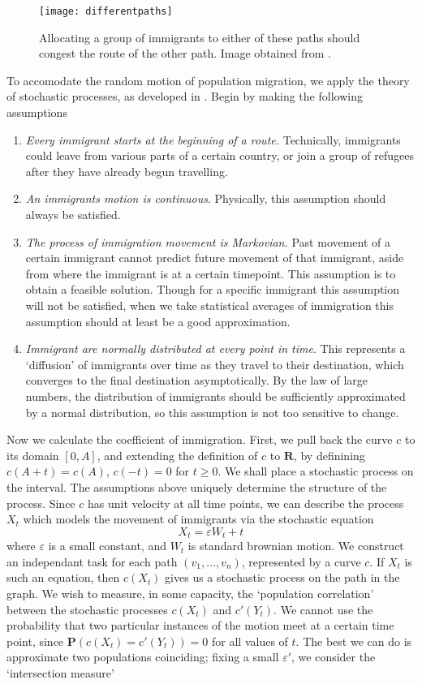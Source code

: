 \documentclass{article}
\begin{document}
\begin{figure}[h]
\begin{center}
\texttt{[image: differentpaths]}
\caption{Allocating a group of immigrants to either of these paths should congest the route of the other path. Image obtained from \cite{twocurve}.}
\end{center}
\end{figure}

To accomodate the random motion of population migration, we apply the theory of stochastic processes, as developed in \cite{lawler}. Begin by making the following assumptions
%
\begin{enumerate}
    \item {\it Every immigrant starts at the beginning of a route.} Technically, immigrants could leave from various parts of a certain country, or join a group of refugees after they have already begun travelling.
    \item {\it An immigrants motion is continuous}. Physically, this assumption should always be satisfied.
    \item {\it The process of immigration movement is Markovian.} Past movement of a certain immigrant cannot predict future movement of that immigrant, aside from where the immigrant is at a certain timepoint. This assumption is to obtain a feasible solution. Though for a specific immigrant this assumption will not be satisfied, when we take statistical averages of immigration this assumption should at least be a good approximation.
    \item {\it Immigrant are normally distributed at every point in time}. This represents a `diffusion' of immigrants over time as they travel to their destination, which converges to the final destination asymptotically. By the law of large numbers, the distribution of immigrants should be sufficiently approximated by a normal distribution, so this assumption is not too sensitive to change.
\end{enumerate}
%
Now we calculate the coefficient of immigration. First, we pull back the curve $c$ to its domain $[0,A]$, and extending the definition of $c$ to $\mathbf{R}$, by definining $c(A + t) = c(A)$, $c(-t) = 0$ for $t \geq 0$. We shall place a stochastic process on the interval. The assumptions above uniquely determine the structure of the process. Since $c$ has unit velocity at all time points, we can describe the process $X_t$ which models the movement of immigrants via the stochastic equation
%
\[ X_t = \varepsilon W_t + t \]
%
where $\varepsilon$ is a small constant, and $W_t$ is standard brownian motion. We construct an independant task for each path $(v_1, \dots, v_n)$, represented by a curve $c$. If $X_t$ is such an equation, then $c(X_t)$ gives us a stochastic process on the path in the graph. We wish to measure, in some capacity, the `population correlation' between the stochastic processes $c(X_t)$ and $c'(Y_t)$. We cannot use the probability that two particular instances of the motion meet at a certain time point, since $\mathbf{P}(c(X_t) = c'(Y_t)) = 0$ for all values of $t$. The best we can do is approximate two populations coinciding; fixing a small $\varepsilon'$, we consider the `intersection measure'
\end{document}
